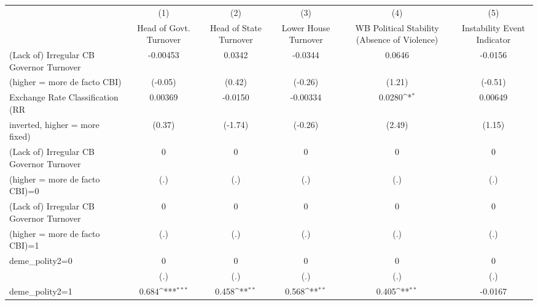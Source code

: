 {
\def\sym#1{\ifmmode^{#1}\else\(^{#1}\)\fi}
\begin{tabular}{l*{5}{c}}
\toprule
                                        &\multicolumn{1}{c}{(1)}&\multicolumn{1}{c}{(2)}&\multicolumn{1}{c}{(3)}&\multicolumn{1}{c}{(4)}&\multicolumn{1}{c}{(5)}\\
                                        &\multicolumn{1}{c}{Head of Govt. Turnover}&\multicolumn{1}{c}{Head of State Turnover}&\multicolumn{1}{c}{Lower House Turnover}&\multicolumn{1}{c}{WB Political Stability (Absence of Violence)}&\multicolumn{1}{c}{Instability Event Indicator}\\
\midrule
(Lack of) Irregular CB Governor Turnover&  -0.00453         &    0.0342         &   -0.0344         &    0.0646         &   -0.0156         \\
(higher = more de facto CBI)            &   (-0.05)         &    (0.42)         &   (-0.26)         &    (1.21)         &   (-0.51)         \\
\addlinespace
Exchange Rate Classification (RR        &   0.00369         &   -0.0150         &  -0.00334         &    0.0280\sym{*}  &   0.00649         \\
inverted, higher = more fixed)          &    (0.37)         &   (-1.74)         &   (-0.26)         &    (2.49)         &    (1.15)         \\
\addlinespace
(Lack of) Irregular CB Governor Turnover&         0         &         0         &         0         &         0         &         0         \\
(higher = more de facto CBI)=0          &       (.)         &       (.)         &       (.)         &       (.)         &       (.)         \\
\addlinespace
(Lack of) Irregular CB Governor Turnover&         0         &         0         &         0         &         0         &         0         \\
(higher = more de facto CBI)=1          &       (.)         &       (.)         &       (.)         &       (.)         &       (.)         \\
\addlinespace
deme\_polity2=0                          &         0         &         0         &         0         &         0         &         0         \\
                                        &       (.)         &       (.)         &       (.)         &       (.)         &       (.)         \\
\addlinespace
deme\_polity2=1                          &     0.684\sym{***}&     0.458\sym{**} &     0.568\sym{**} &     0.405\sym{**} &   -0.0167         \\

\end{tabular}}
